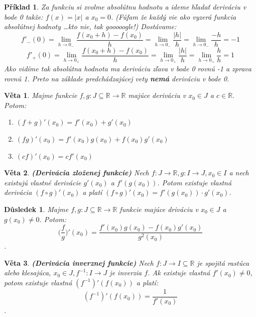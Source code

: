 \documentclass[12pt,a4paper]{article}
\newtheorem{sentence}{Věta}
\newtheorem{example}{Příklad}
\newtheorem{result}{Důsledek}
\begin{document}
\begin{example}
	Za funkciu si zvolme absolútnu hodnotu a ideme hľadať deriváciu v bode 0 takže: $f(x)=|x|$ a $x_{0}=0$. (Fúfam že každý vie ako vyzerá funkcia absolútnej hodnoty \dots kto nie, tak gooooogle!) Dostávame: $$f'_{-}(0)= \lim_{h\rightarrow 0_{-}}\frac{f(x_{0}+h)-f(x_{0})}{h}=\lim_{h\rightarrow 0_{-}}\frac{|h|}{h}=\lim_{h\rightarrow 0_{-}}\frac{-h}{h}=-1$$ $$f'_{+}(0)= \lim_{h\rightarrow 0_{+}}\frac{f(x_{0}+h)-f(x_{0})}{h}=\lim_{h\rightarrow 0_{+}}\frac{|h|}{h}=\lim_{h\rightarrow 0_{+}}\frac{h}{h}=1$$ Ako vidíme tak absolútna hodnota ma deriváciu zľava v bode 0 rovnú -1 a zprava rovnú 1. Preto na základe predchádzajúcej vety \textbf{nemá} deriváciu v bode 0.
\end{example}

\begin{sentence}
	Majme funkcie $f, g:J\subseteq \mathds{R} \rightarrow \mathds{R}$ majúce deriváciu v $x_{0}\in J$ a $c\in \mathds{R}$. Potom:
	\begin{enumerate}
		\item $(f+g)'(x_{0})=f'(x_{0})+g'(x_{0})$
		\item $(fg)'(x_{0})=f'(x_{0})g(x_{0})+f(x_{0})g'(x_{0})$
		\item $(cf)'(x_{0})=cf'(x_{0})$
	\end{enumerate}
\end{sentence}

\begin{sentence}
	\textbf{(Derivácia zloženej funkcie)} Nech $f:J\rightarrow \mathds{R}, g:I\rightarrow J, x_{0}\in I$ a nech existujú vlastné derivácie $g'(x_{0})$ a $f'(g(x_{0}))$. Potom existuje vlastná derivácia $(f\circ g)'(x_{0})$ a platí $(f\circ g)'(x_{0})=f'(g(x_{0}))\cdot g'(x_{0})$.
\end{sentence}

\begin{result}
	Majme $f, g:J\subseteq \mathds{R} \rightarrow \mathds{R}$ funkcie majúce driváciu v $x_{0}\in J$ a $g(x_{0})\neq 0$. Potom: $$\bigg(\frac{f}{g}\bigg)'(x_{0})=\frac{f'(x_{0})g(x_{0})-f(x_{0})g'(x_{0})}{g^{2}(x_{0})}$$.
\end{result}

\begin{sentence}
	\textbf{(Derivácia inverznej funkcie)} Nech $f:J\rightarrow I\subseteq\mathds{R}$ je spojitá rastúca alebo klesajúca, $x_{0}\in J, f^{-1}:I\rightarrow J$ je inverzia $f$. Ak existuje vlastná $f'(x_{0})\neq 0$, potom existuje vlastná $(f^{-1})'(f(x_{0}))$ a platí:$$(f^{-1})'(f(x_{0}))=\frac{1}{f'(x_{0})}$$.
\end{sentence}
\end{document}
